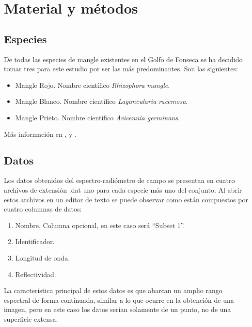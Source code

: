 


\chapter{Material y métodos}
\label{cap:materialymetodos}

\section{Especies}
De todas las especies de mangle existentes en el Golfo de Fonseca se ha decidido tomar tres para este estudio por ser las más predominantes. Son las siguientes:

\begin{itemize}
	\item Mangle Rojo. Nombre científico \textit{Rhizophora mangle}.
	\item Mangle Blanco. Nombre científico \textit{Laguncularia racemosa}.
	\item Mangle Prieto. Nombre científico \textit{Avicennia germinans}.
\end{itemize}

Más información en \cite{JimenezLaguncularia}, \cite{JimenezRhizophora} y \cite{JimenezAvicennia}.

\section{Datos}
\label{sec:datos}
Los datos obtenidos del espectro-radiómetro de campo se presentan en cuatro archivos de extensión .dat uno para cada especie más uno del conjunto. Al abrir estos archivos en un editor de texto se puede observar como están compuestos por 
cuatro columnas de datos:

\begin{enumerate}
	\item Nombre. Columna opcional, en este caso será ``Subset 1''.
	\item Identificador.
	\item Longitud de onda.
	\item Reflectividad.
\end{enumerate}

La característica principal de estos datos es que abarcan un amplio rango espectral de forma continuada, similar a lo que ocurre en la obtención de una imagen, pero en este caso los datos serían solamente de un punto, no de una superficie extensa.\Sep

